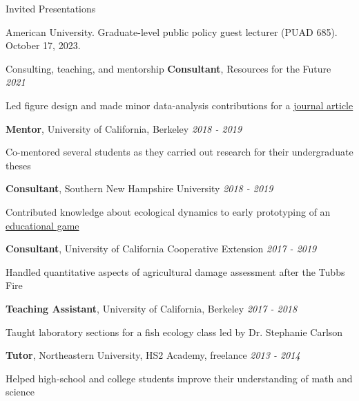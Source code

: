 \documentclass{resume} %
\begin{document}
\begin{rSection}{Invited Presentations}

{American University. Graduate-level public policy guest lecturer (PUAD 685). October 17, 2023.}

\end{rSection}

\begin{rSection}{Consulting, teaching, and mentorship}
{\bf Consultant}{, Resources for the Future} \hfill {\em 2021}
\vspace{-7pt}
\begin{adjustwidth}{12pt}{}
{\small Led figure design and made minor data-analysis contributions for a \href{https://www.brookings.edu/articles/the-social-cost-of-carbon/}{journal article}}
\end{adjustwidth}
{\bf Mentor}{, University of California, Berkeley} \hfill {\em 2018 - 2019}
\vspace{-7pt}
\begin{adjustwidth}{12pt}{}
{\small Co-mentored several students as they carried out research for their undergraduate theses}
\end{adjustwidth}
{\bf Consultant}{, Southern New Hampshire University} \hfill {\em 2018 - 2019}
\vspace{-7pt}
\begin{adjustwidth}{12pt}{}
{\small Contributed knowledge about ecological dynamics to early prototyping of an \href{https://vimeo.com/417368718}{educational game}}
\end{adjustwidth}
{\bf Consultant}{, University of California Cooperative Extension} \hfill {\em 2017 - 2019}
\vspace{-7pt}
\begin{adjustwidth}{12pt}{}
{\small Handled quantitative aspects of agricultural damage assessment after the Tubbs Fire}
\end{adjustwidth}
{\bf Teaching Assistant}{, University of California, Berkeley} \hfill {\em 2017 - 2018}
\vspace{-7pt}
\begin{adjustwidth}{12pt}{}
{\small Taught laboratory sections for a fish ecology class led by Dr. Stephanie Carlson}
\end{adjustwidth}
{\bf Tutor}{, Northeastern University, HS2 Academy, freelance} \hfill {\em 2013 - 2014}
\vspace{-7pt}
\begin{adjustwidth}{12pt}{}
{\small Helped high-school and college students improve their understanding of math and science}
\end{adjustwidth}
\end{rSection}
\end{document}
